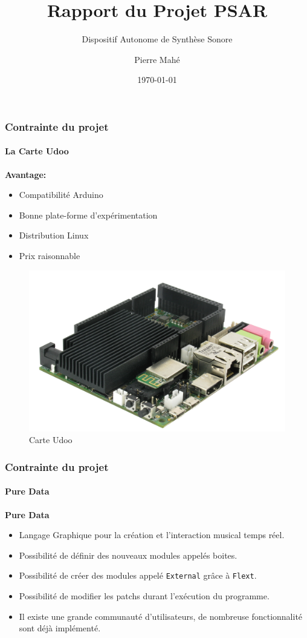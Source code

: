 \documentclass{beamer}
\title{Rapport du Projet PSAR}
\subtitle{Dispositif Autonome de Synthèse Sonore}
\institute{Encadrant : Hugues Genevois}
\author{Pierre Mahé}
\date{\today}
\begin{document}
\begin{frame}
\titlepage
\end{frame}


\begin{frame}
\frametitle{Contrainte du projet}
\framesubtitle{La Carte Udoo}
\begin{minipage}{0.49\textwidth}
\textbf{Avantage:}
\begin{itemize}
\item Compatibilité Arduino
\item Bonne plate-forme d’expérimentation
\item Distribution Linux
\item Prix raisonnable
\end{itemize}
\end{minipage}
\begin{minipage}{0.49\textwidth}
\begin{figure}
  \centering
  \includegraphics[width=\textwidth]{udoo.jpg} 
	\caption{Carte Udoo}
\end{figure}
\end{minipage}
\end{frame}


\begin{frame}
\frametitle{Contrainte du projet}
\framesubtitle{Pure Data}
\textbf{Pure Data}
\begin{itemize}
\item Langage Graphique pour la création et l'interaction musical temps réel.
\item Possibilité de définir des nouveaux modules appelés boites.
\item Possibilité de créer des modules appelé \texttt{External} grâce à \texttt{Flext}.
\item Possibilité de modifier les patchs durant l’exécution du programme.
\item Il existe une grande communauté d'utilisateurs, de nombreuse fonctionnalité sont déjà implémenté.
\end{itemize}
\end{frame}
\end{document}
